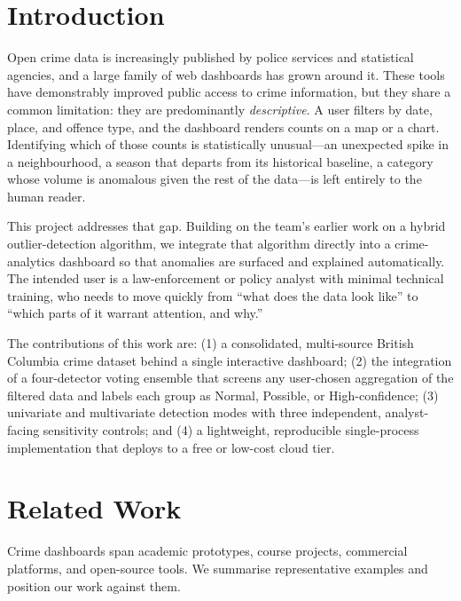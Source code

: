 \documentclass[conference]{IEEEtran}
\begin{document}
\section{Introduction}
Open crime data is increasingly published by police services and statistical agencies, and a large family of web dashboards has grown around it. These tools have demonstrably improved public access to crime information, but they share a common limitation: they are predominantly \textit{descriptive}. A user filters by date, place, and offence type, and the dashboard renders counts on a map or a chart. Identifying which of those counts is statistically unusual---an unexpected spike in a neighbourhood, a season that departs from its historical baseline, a category whose volume is anomalous given the rest of the data---is left entirely to the human reader.

This project addresses that gap. Building on the team's earlier work on a hybrid outlier-detection algorithm, we integrate that algorithm directly into a crime-analytics dashboard so that anomalies are surfaced and explained automatically. The intended user is a law-enforcement or policy analyst with minimal technical training, who needs to move quickly from ``what does the data look like'' to ``which parts of it warrant attention, and why.''

The contributions of this work are: (1) a consolidated, multi-source British Columbia crime dataset behind a single interactive dashboard; (2) the integration of a four-detector voting ensemble that screens any user-chosen aggregation of the filtered data and labels each group as Normal, Possible, or High-confidence; (3) univariate and multivariate detection modes with three independent, analyst-facing sensitivity controls; and (4) a lightweight, reproducible single-process implementation that deploys to a free or low-cost cloud tier.

\section{Related Work}
Crime dashboards span academic prototypes, course projects, commercial platforms, and open-source tools. We summarise representative examples and position our work against them.
\end{document}

